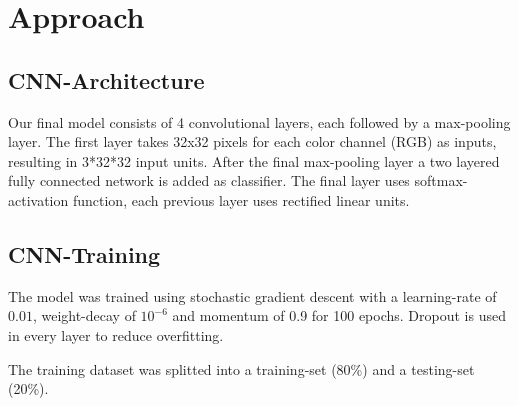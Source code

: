 \documentclass[	DIV=calc,%
				paper=a4,%
				fontsize=11pt,%
				twocolumn]{scrartcl}	 %
\begin{document}
\section{Approach}

\subsection*{CNN-Architecture}
Our final model consists of 4 convolutional layers, each followed by a max-pooling layer. The first layer takes 32x32 pixels for each color channel (RGB) as inputs, resulting in 3*32*32 input units.
After the final max-pooling layer a two layered fully connected network is added as classifier. The final layer uses softmax-activation function, each previous layer uses rectified linear units.

\subsection*{CNN-Training}
The model was trained using stochastic gradient descent with a learning-rate of $0.01$, weight-decay of $10^{-6}$ and momentum of 0.9 for 100 epochs.
Dropout is used in every layer to reduce overfitting.

The training dataset was splitted into a training-set (80\%) and a testing-set (20\%).
\end{document}
